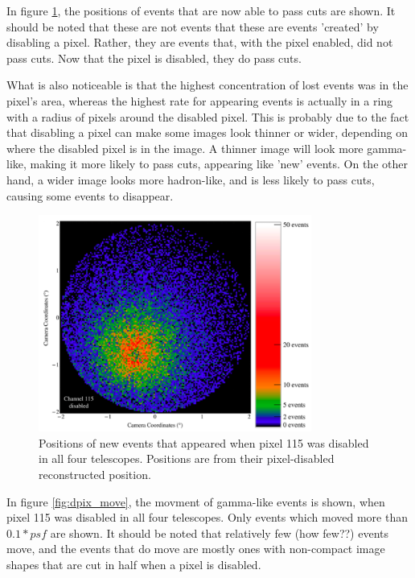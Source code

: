     In figure \ref{fig:dpix_appear}, the positions of events that are now able to pass cuts are shown.
    It should be noted that these are not events that these are events 'created' by disabling a pixel.
    Rather, they are events that, with the pixel enabled, did not pass cuts.
    Now that the pixel is disabled, they do pass cuts.

    What is also noticeable is that the highest concentration of lost events was in the pixel's area, whereas the highest rate for appearing events is actually in a ring with a radius of  pixels around the disabled pixel.
    This is probably due to the fact that disabling a pixel can make some images look thinner or wider, depending on where the disabled pixel is in the image.
    A thinner image will look more gamma-like, making it more likely to pass cuts, appearing like 'new' events.
    On the other hand, a wider image looks more hadron-like, and is less likely to pass cuts, causing some events to disappear.

    \begin{figure}[ht]
      \begin{center}
        \includegraphics[width=0.8\textwidth]{images/disabled_pixel/appearing_events}
        \caption[Newly Appearing Events]{Positions of new events that appeared when pixel 115 was disabled in all four telescopes.  Positions are from their pixel-disabled reconstructed position.}\label{fig:dpix_appear}
      \end{center}
    \end{figure}

    In figure \ref{fig:dpix_move}, the movment of gamma-like events is shown, when pixel 115 was disabled in all four telescopes.
    Only events which moved more than $0.1*psf$ are shown.
    It should be noted that relatively few (how few??) events move, and the events that do move are mostly ones with non-compact image shapes that are cut in half when a pixel is disabled.

